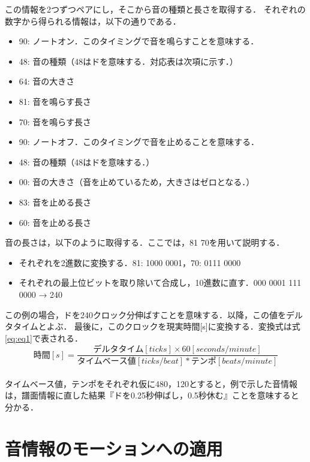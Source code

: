 この情報を2つずつペアにし，そこから音の種類と長さを取得する．
それぞれの数字から得られる情報は，以下の通りである．
\newpage
\begin{itemize}
	\item 90: ノートオン．このタイミングで音を鳴らすことを意味する．
	\item 48: 音の種類（48はドを意味する．対応表は次項に示す．）
	\item 64: 音の大きさ
	\item 81: 音を鳴らす長さ
	\item 70: 音を鳴らす長さ
	\item 90: ノートオフ．このタイミングで音を止めることを意味する．
	\item 48: 音の種類（48はドを意味する．）
	\item 00: 音の大きさ（音を止めているため，大きさはゼロとなる．）
	\item 83: 音を止める長さ
	\item 60: 音を止める長さ
\end{itemize}
\vspace{5mm}
音の長さは，以下のように取得する．ここでは，81 70を用いて説明する．
\begin{itemize}
	\item それぞれを2進数に変換する．\hspace{1mm}81: 1000 0001，70: 0111 0000
	\item それぞれの最上位ビットを取り除いて合成し，10進数に直す．\hspace{1mm}000 0001 111 0000 → 240
\end{itemize}
\vspace{5mm}
この例の場合，ドを240クロック分伸ばすことを意味する．以降，この値をデルタタイムとよぶ．
最後に，このクロックを現実時間[s]に変換する．変換式は式\eqref{eq:eq1}で表される．\\
\begin{equation}
\label{eq:eq1}
時間[s] = 
\frac {デルタタイム[ticks] × 60[seconds/minute]}{タイムベース値[ticks/beat] * テンポ[beats/minute]}
\end{equation}
\\
タイムベース値，テンポをそれぞれ仮に480，120とすると，例で示した音情報は，譜面情報に直した結果『ドを0.25秒伸ばし，0.5秒休む』ことを意味すると分かる．
\newpage
\section{音情報のモーションへの適用} \label{sec:adapt}
